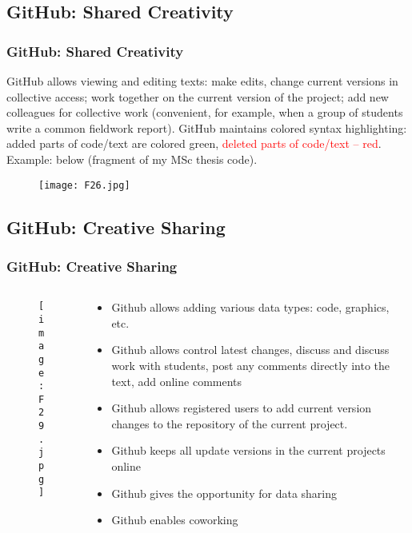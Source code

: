 \documentclass[pdflatex,compress,8pt,
	xcolor={dvipsnames,dvipsnames,svgnames,x11names,table},
	hyperref={
	breaklinks = true, 
	pdfauthor={Lemenkova Polina}, 
	pdfsubject={Preentation}, 
	pdfcreator={Lemenkova Polina}, 
	pdfproducer={Lemenkova Polina}, 
	colorlinks=true,linkcolor=blue, 
	citecolor=NavyBlue, 
	urlcolor = NavyBlue, 
	breaklinks = true}]{beamer}
\begin{document}
\subsection{GitHub: Shared Creativity}
\begin{frame}\frametitle{GitHub: Shared Creativity}
GitHub allows viewing and editing texts: make edits, change current versions in collective access; work together on the current version of the project; add new colleagues for collective work (convenient, for example, when a group of students write a common fieldwork report). GitHub maintains colored syntax highlighting: \textcolor{Green3}{added parts of code/text are colored green}, \textcolor{red}{deleted parts of code/text -- red}. Example: below (fragment of my MSc thesis code).
\begin{figure}[H]
	\centering
		\texttt{[image: F26.jpg]}
\end{figure}
\end{frame}

\subsection{GitHub: Creative Sharing}
\begin{frame}\frametitle{GitHub: Creative Sharing}
\begin{minipage}[0.4\textheight]{\textwidth}
\begin{columns}[T]
\begin{column}{0.5\textwidth}
\vspace{1em}
\begin{figure}[H]
	\centering
		\texttt{[image: F29.jpg]}
\end{figure}
\end{column}
\begin{column}{0.5\textwidth}
\vspace{3em} 
\begin{itemize}
	\item Github allows adding various data types: code, graphics, etc.
	\item Github allows control latest changes, discuss and discuss work with students, post any comments directly into the text, add online comments
	\item Github allows registered users to add current version changes to the repository of the current project.
	\item Github keeps all update versions in the current projects online
	\item Github gives the opportunity for data sharing
	\item Github enables coworking 
\end{itemize}
\end{column}
\end{columns}
\end{minipage}
\end{frame}
 
\end{document}
